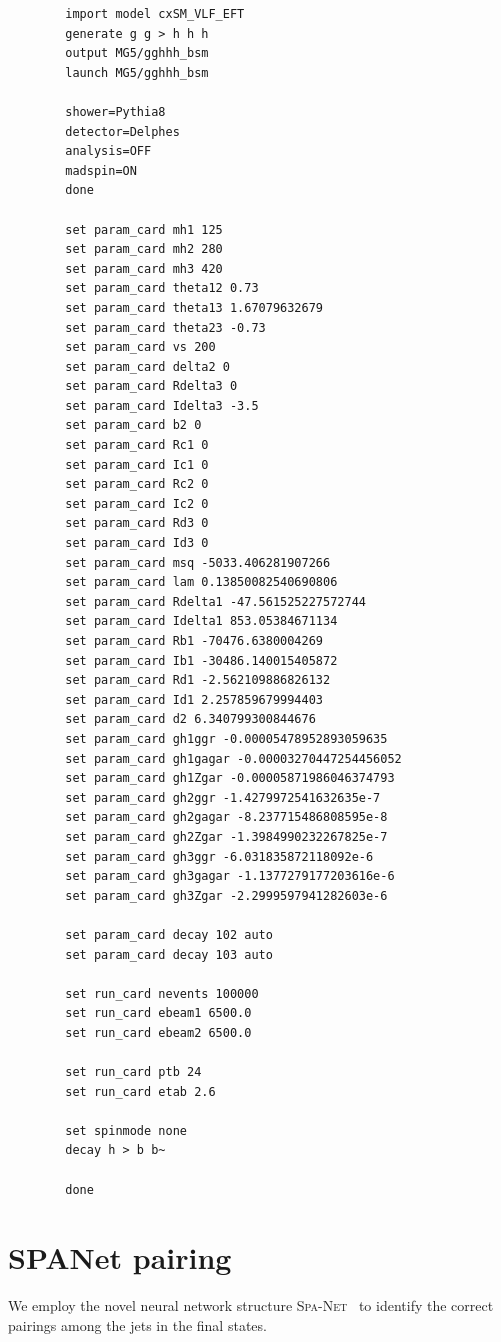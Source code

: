 \documentclass[12pt]{article}
\begin{document}
    \begin{lstlisting}
        import model cxSM_VLF_EFT
        generate g g > h h h
        output MG5/gghhh_bsm
        launch MG5/gghhh_bsm

        shower=Pythia8
        detector=Delphes
        analysis=OFF
        madspin=ON
        done

        set param_card mh1 125
        set param_card mh2 280
        set param_card mh3 420
        set param_card theta12 0.73
        set param_card theta13 1.67079632679
        set param_card theta23 -0.73
        set param_card vs 200
        set param_card delta2 0
        set param_card Rdelta3 0
        set param_card Idelta3 -3.5
        set param_card b2 0
        set param_card Rc1 0
        set param_card Ic1 0
        set param_card Rc2 0
        set param_card Ic2 0
        set param_card Rd3 0
        set param_card Id3 0
        set param_card msq -5033.406281907266
        set param_card lam 0.13850082540690806
        set param_card Rdelta1 -47.561525227572744
        set param_card Idelta1 853.05384671134
        set param_card Rb1 -70476.6380004269
        set param_card Ib1 -30486.140015405872
        set param_card Rd1 -2.562109886826132
        set param_card Id1 2.257859679994403
        set param_card d2 6.340799300844676
        set param_card gh1ggr -0.00005478952893059635
        set param_card gh1gagar -0.00003270447254456052
        set param_card gh1Zgar -0.00005871986046374793
        set param_card gh2ggr -1.4279972541632635e-7
        set param_card gh2gagar -8.237715486808595e-8
        set param_card gh2Zgar -1.3984990232267825e-7
        set param_card gh3ggr -6.031835872118092e-6
        set param_card gh3gagar -1.1377279177203616e-6
        set param_card gh3Zgar -2.2999597941282603e-6

        set param_card decay 102 auto
        set param_card decay 103 auto

        set run_card nevents 100000
        set run_card ebeam1 6500.0
        set run_card ebeam2 6500.0

        set run_card ptb 24
        set run_card etab 2.6

        set spinmode none
        decay h > b b~

        done
    \end{lstlisting}
\section{SPANet pairing}%
\label{sec:spanet_pairing}
    We employ the novel neural network structure \textsc{Spa-Net}~\cite{PhysRevD.105.112008, Fenton:2023ikr, 10.21468/SciPostPhys.12.5.178} to identify the correct pairings among the jets in the final states.
\end{document}
